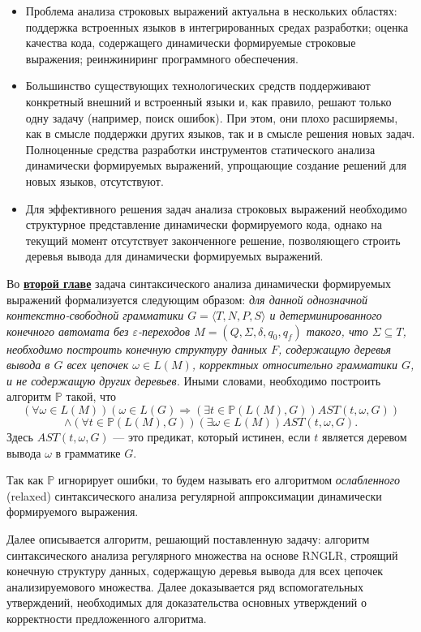 \begin{itemize}
    \item Проблема анализа строковых выражений актуальна в нескольких областях: поддержка встроенных языков в интегрированных средах разработки; оценка качества кода, содержащего динамически формируемые строковые выражения; реинжиниринг программного обеспечения.
    \item Большинство существующих технологических средств поддерживают конкретный внешний и встроенный языки и, как правило, решают только одну задачу (например, поиск ошибок). При этом, они плохо расширяемы, как в смысле поддержки других языков, так и в смысле решения новых задач. Полноценные средства разработки инструментов статического анализа динамически формируемых выражений, упрощающие создание решений для новых языков, отсутствуют.
    \item Для эффективного решения задач анализа строковых выражений необходимо структурное представление динамически формируемого кода, однако на текущий момент отсутствует законченноге решение, позволяющего строить деревья вывода для динамически формируемых выражений.
\end{itemize}

Во \underline{\textbf{второй главе}} задача синтаксического анализа динамически формируемых выражений формализуется следующим образом: \textit{ для данной однозначной контекстно-свободной грамматики $G = \langle T, N, P, S \rangle$ и детерминированного конечного автомата без $\varepsilon$-переходов $M=(Q,\Sigma,\delta,q_0,q_f)$ такого, что $\Sigma \subseteq T$, необходимо построить конечную структуру данных $F$, содержащую деревья вывода в $G$ всех цепочек $\omega \in L(M)$, корректных относительно грамматики $G$, и не содержащую других деревьев. } Иными словами, необходимо построить алгоритм $\mathbb{P}$ такой, что
    $$(\forall \omega \in L(M)) (\omega \in L(G) \Rightarrow (\exists t \in \mathbb{P}(L(M),G))AST(t, \omega, G))$$
    $$\land (\forall t \in \mathbb{P}(L(M),G))(\exists \omega \in L(M))AST(t,\omega,G).$$ 
    Здесь $AST(t,\omega,G)$ --- это предикат, который истинен, если $t$ является деревом вывода $\omega$ в грамматике $G$.


Так как $\mathbb{P}$ игнорирует ошибки, то будем называть его алгоритмом \textit{ослабленного} (relaxed) синтаксического анализа регулярной аппроксимации динамически формируемого выражения.

Далее описывается алгоритм, решающий поставленную задачу: алгоритм синтаксического анализа регулярного множества на основе RNGLR, строящий конечную структуру данных, содержащую деревья вывода для 
всех цепочек анализируемового множества. Далее доказывается ряд вспомогательных утверждений, необходимых для доказательства основных утверждений о корректности предложенного алгоритма.


